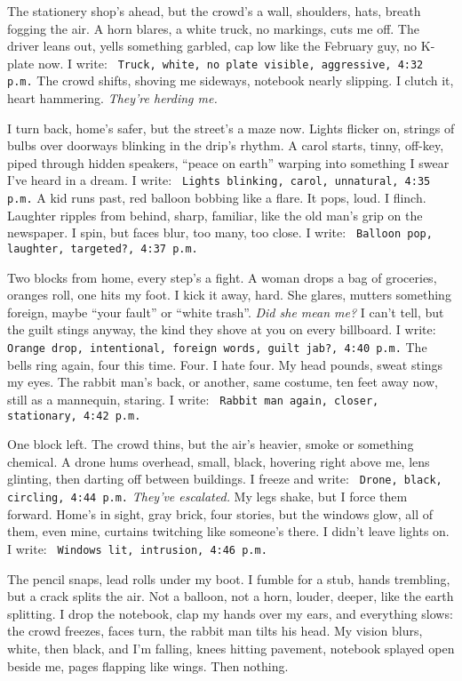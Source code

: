 \documentclass[12pt]{article}
\newcommand{\note}[1]{\texttt{\small \color{DarkGray} #1}}
\begin{document}
The stationery shop’s ahead, but the crowd’s a wall, shoulders, hats, breath fogging the air. A horn blares, a white truck, no markings, cuts me off. The driver leans out, yells something garbled, cap low like the February guy, no K-plate now. I write: \note{Truck, white, no plate visible, aggressive, 4:32 p.m.} The crowd shifts, shoving me sideways, notebook nearly slipping. I clutch it, heart hammering. \textit{They’re herding me.}

I turn back, home’s safer, but the street’s a maze now. Lights flicker on, strings of bulbs over doorways blinking in the drip’s rhythm. A carol starts, tinny, off-key, piped through hidden speakers, “peace on earth” warping into something I swear I’ve heard in a dream. I write: \note{Lights blinking, carol, unnatural, 4:35 p.m.} A kid runs past, red balloon bobbing like a flare. It pops, loud. I flinch. Laughter ripples from behind, sharp, familiar, like the old man’s grip on the newspaper. I spin, but faces blur, too many, too close. I write: \note{Balloon pop, laughter, targeted?, 4:37 p.m.}

Two blocks from home, every step’s a fight. A woman drops a bag of groceries, oranges roll, one hits my foot. I kick it away, hard. She glares, mutters something foreign, maybe “your fault” or “white trash”. \textit{Did she mean me?} I can’t tell, but the guilt stings anyway, the kind they shove at you on every billboard. I write: \note{Orange drop, intentional, foreign words, guilt jab?, 4:40 p.m.} The bells ring again, four this time. Four. I hate four. My head pounds, sweat stings my eyes. The rabbit man’s back, or another, same costume, ten feet away now, still as a mannequin, staring. I write: \note{Rabbit man again, closer, stationary, 4:42 p.m.}

One block left. The crowd thins, but the air’s heavier, smoke or something chemical. A drone hums overhead, small, black, hovering right above me, lens glinting, then darting off between buildings. I freeze and write: \note{Drone, black, circling, 4:44 p.m.} \textit{They’ve escalated.} My legs shake, but I force them forward. Home’s in sight, gray brick, four stories, but the windows glow, all of them, even mine, curtains twitching like someone’s there. I didn’t leave lights on. I write: \note{Windows lit, intrusion, 4:46 p.m.}

The pencil snaps, lead rolls under my boot. I fumble for a stub, hands trembling, but a crack splits the air. Not a balloon, not a horn, louder, deeper, like the earth splitting. I drop the notebook, clap my hands over my ears, and everything slows: the crowd freezes, faces turn, the rabbit man tilts his head. My vision blurs, white, then black, and I’m falling, knees hitting pavement, notebook splayed open beside me, pages flapping like wings. Then nothing.
\end{document}
